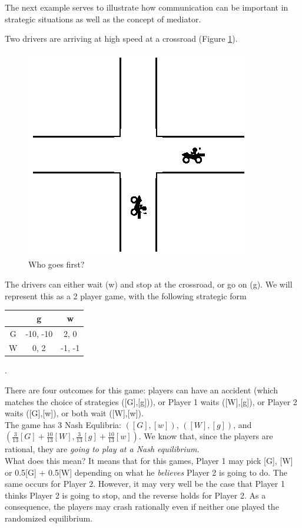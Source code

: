 The next example serves to illustrate how communication can be important in strategic situations as well as the concept of mediator.

\begin{example}
Two drivers are arriving at high speed at a crossroad (Figure \ref{ch6:fig:crossroads}).
\begin{figure}[!ht]
\centering
\includegraphics[scale=1.5]{crossroads.eps}
\caption{Who goes first?}
\label{ch6:fig:crossroads}
\end{figure}
The drivers can either wait (w) and stop at the crossroad, or go on (g).
We will represent this as a 2 player game, with the following strategic form
\begin{center}
\begin{tabular}{c | c  c}
& g & w\\
\hline
G & -10, -10 & 2, 0  \\
W & 0, 2 & -1, -1
\end{tabular}
.
\end{center}

There are four outcomes for this game: players can have an accident (which matches the choice of strategies ([G],[g])), or Player 1 waits ([W],[g]), or Player 2 waits ([G],[w]), or both wait ([W],[w]). \\
The game has 3 Nash Equlibria: $([G],[w])$, $([W],[g])$, and $(\frac{3}{13}[G] + \frac{10}{13}[W], \frac{3}{13}[g] + \frac{10}{13}[w])$. We know that, since the players are rational, they are \emph{going to play at a Nash equilibrium}. \\
What does this mean? It means that for this games, Player 1 may pick [G], [W] or 0.5[G] + 0.5[W] depending on what he \emph{believes} Player 2 is going to do. The same occurs for Player 2.
However, it may very well be the case that Player 1 thinks Player 2 is going to stop, and the reverse holds for Player 2. As a consequence, the players may crash rationally even if neither one played the randomized equilibrium.


\end{example}
